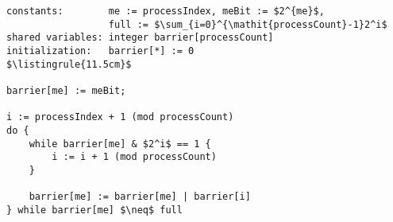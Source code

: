 \begin{minipage}
\centering
\begin{lstlisting}[mathescape, linewidth=11.5cm]
constants:        me := processIndex, meBit := $2^{me}$,
                  full := $\sum_{i=0}^{\mathit{processCount}-1}2^i$
shared variables: integer barrier[processCount]
initialization:   barrier[*] := 0
$\listingrule{11.5cm}$

barrier[me] := meBit;

i := processIndex + 1 (mod processCount)
do {
	while barrier[me] & $2^i$ == 1 {
		i := i + 1 (mod processCount)
	}

	barrier[me] := barrier[me] | barrier[i]
} while barrier[me] $\neq$ full
\end{lstlisting}
\end{minipage}
